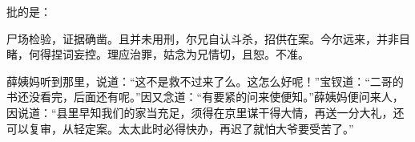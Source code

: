 \begin{parag}
    批的是：
\end{parag}


\begin{qute2sp}
    尸场检验，证据确凿。且并未用刑，尔兄自认斗杀，招供在案。今尔远来，并非目睹，何得捏词妄控。理应治罪，姑念为兄情切，且恕。不准。
\end{qute2sp}


\begin{parag}
    薛姨妈听到那里，说道：“这不是救不过来了么。这怎么好呢！”宝钗道：“二哥的书还没看完，后面还有呢。”因又念道：“有要紧的问来使便知。”薛姨妈便问来人，因说道：“县里早知我们的家当充足，须得在京里谋干得大情，再送一分大礼，还可以复审，从轻定案。太太此时必得快办，再迟了就怕大爷要受苦了。”
\end{parag}


